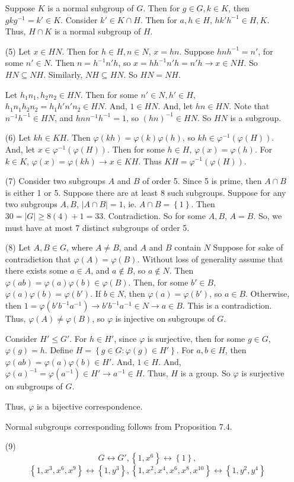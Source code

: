 \documentclass[12pt]{article}
\begin{document}
\begin{itemize}
Suppose $K$ is a normal subgroup of $G$. Then for $g \in G, k \in K$, then $gkg^{-1} = k' \in K$. Consider $k' \in K \cap H$. Then for $a, h \in H$, $hk'h^{-1} \in H, K$. Thus, $H \cap K$ is a normal subgroup of $H$.
\item[(5)]
Let $x \in HN$. Then for $h \in H, n \in N$, $x = hn$. Suppose $hnh^{-1} = n'$, for some $n' \in N$. Then $n = h^{-1}n'h$, so $x = hh^{-1}n'h = n'h \rightarrow x \in NH$. So $HN \subseteq NH$. Similarly, $NH \subseteq HN$. So $HN = NH$. 

Let $h_1n_1, h_2n_2 \in HN$. Then for some $n' \in N, h' \in H$, $h_1n_1h_2n_2 = h_1h'n'n_2 \in HN$. And, $1 \in HN$. And, let $hn \in HN$. Note that $n^{-1}h^{-1} \in HN$, and $hnn^{-1}h^{-1} = 1$, so $(hn)^{-1} \in HN$. So $HN$ is a subgroup.
\item[(6)]
Let $kh \in KH$. Then $\varphi(kh) = \varphi(k)\varphi(h)$, so $kh \in \varphi^{-1}(\varphi(H))$. And, let $x \in \varphi^{-1}(\varphi(H))$. Then for some $h \in H$, $\varphi(x) = \varphi(h)$. For $k \in K$, $\varphi(x) = \varphi(kh) \rightarrow x \in KH$. Thus $KH = \varphi^{-1}(\varphi(H))$.
\item[(7)]
Consider two subgroups $A$ and $B$ of order 5. Since 5 is prime, then $A \cap B$ is either 1 or 5. Suppose there are at least 8 such subgroups. Suppose for any two subgroups $A, B$, $|A \cap B| = 1$, ie. $A \cap B = \left\lbrace 1 \right\rbrace$. Then $30 = |G| \geq 8(4) + 1 = 33$. Contradiction. So for some $A, B$, $A = B$. So, we must have at most 7 distinct subgroups of order 5.
\item[(8)]
Let $A, B \in G$, where $A \neq B$, and $A$ and $B$ contain $N$ Suppose for sake of contradiction that $\varphi(A) = \varphi(B)$. Without loss of generality assume that there exists some $a \in A$, and $a \not \in B$, so $a \not \in N$. Then $\varphi(ab) = \varphi(a)\varphi(b) \in \varphi(B)$. Then, for some $b' \in B$, $\varphi(a)\varphi(b) = \varphi(b')$. If $b \in N$, then $\varphi(a) = \varphi(b')$, so $a \in B$. Otherwise, then $1 = \varphi(b'b^{-1}a^{-1}) \rightarrow b'b^{-1}a^{-1} \in N \rightarrow a \in B$. This is a contradiction. Thus, $\varphi(A) \neq \varphi(B)$, so $\varphi$ is injective on subgroups of $G$. 

Consider $H' \leq G'$. For $h \in H'$, since $\varphi$ is surjective, then for some $g \in G$, $\varphi(g) = h$. Define $H = \left\lbrace g \in G : \varphi(g) \in H' \right\rbrace$. For $a, b \in H$, then $\varphi(ab) = \varphi(a)\varphi(b) \in H'$. And, $1 \in H$. And, $\varphi(a)^{-1} = \varphi(a^{-1}) \in H' \rightarrow a^{-1} \in H$. Thus, $H$ is a group. So $\varphi$ is surjective on subgroups of $G$.

Thus, $\varphi$ is a bijective correspondence.

Normal subgroups corresponding follows from Proposition 7.4.
\item[(9)]
$$G \leftrightarrow G', \left\lbrace 1, x^6 \right\rbrace \leftrightarrow \left\lbrace 1 \right\rbrace,$$
$$\left\lbrace 1, x^3, x^6, x^9 \right\rbrace \leftrightarrow \left\lbrace 1, y^3 \right\rbrace, \left\lbrace 1, x^2, x^4, x^6, x^8, x^{10} \right\rbrace \leftrightarrow \left\lbrace 1, y^2, y^4 \right\rbrace$$
\end{itemize}
\end{document}
